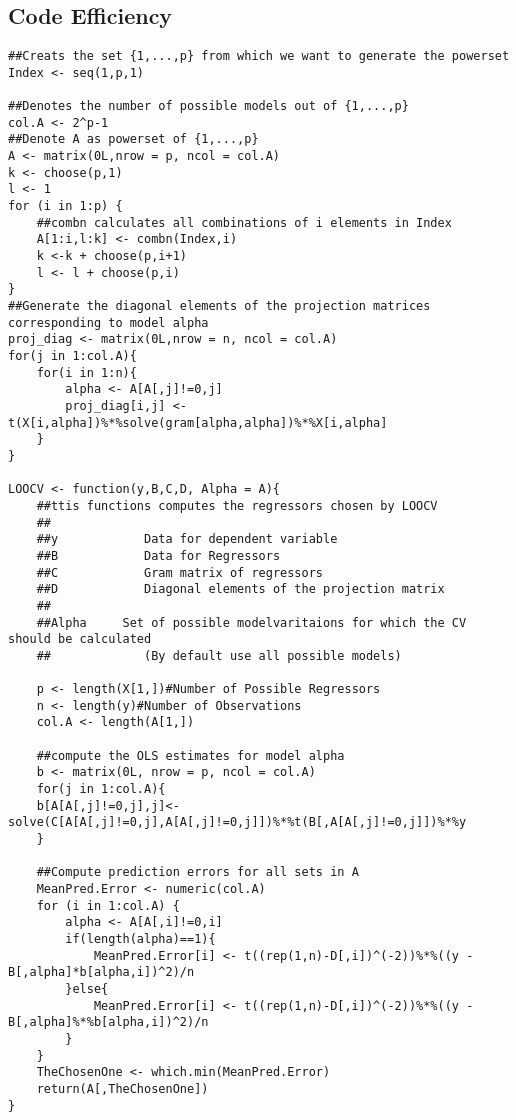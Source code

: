 \documentclass[Research_Module_ES.tex]{subfiles}
\begin{document}
\subsection*{Code Efficiency}

\begin{lstlisting}[title={Leave-one-Out Cross-Validation Function}]
##Creats the set {1,...,p} from which we want to generate the powerset
Index <- seq(1,p,1)    

##Denotes the number of possible models out of {1,...,p}
col.A <- 2^p-1
##Denote A as powerset of {1,...,p}
A <- matrix(0L,nrow = p, ncol = col.A)      
k <- choose(p,1)
l <- 1
for (i in 1:p) {
	##combn calculates all combinations of i elements in Index 
	A[1:i,l:k] <- combn(Index,i)             
	k <-k + choose(p,i+1)
	l <- l + choose(p,i)
}
##Generate the diagonal elements of the projection matrices corresponding to model alpha
proj_diag <- matrix(0L,nrow = n, ncol = col.A)
for(j in 1:col.A){
	for(i in 1:n){
		alpha <- A[A[,j]!=0,j]
		proj_diag[i,j] <- t(X[i,alpha])%*%solve(gram[alpha,alpha])%*%X[i,alpha]
	}
}

LOOCV <- function(y,B,C,D, Alpha = A){
	##ttis functions computes the regressors chosen by LOOCV
	##
	##y            Data for dependent variable
	##B            Data for Regressors
	##C            Gram matrix of regressors
	##D            Diagonal elements of the projection matrix
	##
	##Alpha     Set of possible modelvaritaions for which the CV should be calculated 
	##             (By default use all possible models)  

	p <- length(X[1,])#Number of Possible Regressors
	n <- length(y)#Number of Observations
	col.A <- length(A[1,])

	##compute the OLS estimates for model alpha
	b <- matrix(0L, nrow = p, ncol = col.A)
	for(j in 1:col.A){
	b[A[A[,j]!=0,j],j]<- solve(C[A[A[,j]!=0,j],A[A[,j]!=0,j]])%*%t(B[,A[A[,j]!=0,j]])%*%y
	}

	##Compute prediction errors for all sets in A
	MeanPred.Error <- numeric(col.A)
	for (i in 1:col.A) {
		alpha <- A[A[,i]!=0,i]
		if(length(alpha)==1){
			MeanPred.Error[i] <- t((rep(1,n)-D[,i])^(-2))%*%((y - B[,alpha]*b[alpha,i])^2)/n
		}else{
			MeanPred.Error[i] <- t((rep(1,n)-D[,i])^(-2))%*%((y - B[,alpha]%*%b[alpha,i])^2)/n 
		}
	}
	TheChosenOne <- which.min(MeanPred.Error)
	return(A[,TheChosenOne])
}
\end{lstlisting}
\end{document}
